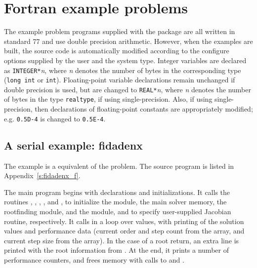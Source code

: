 \section{Fortran example problems}\label{s:ex_fortran}

The {\F} example problem programs supplied with the {\ida}
package are all written in standard {\F}77 and use double precision
arithmetic. However, when the {\F} examples are built, the source code is
automatically modified according to the configure options supplied by the
user and the system type. Integer variables are declared as {\tt INTEGER*}{\em n},
where {\em n} denotes the number of bytes in the corresponding {\C} type
({\tt long int} or {\tt int}). Floating-point variable declarations remain
unchanged if double precision is used, but are changed to {\tt REAL*}{\em n},
where {\em n} denotes the number of bytes in the {\sundials} type {\tt realtype},
if using single-precision. Also, if using single-precision, then declarations of
floating-point constants are appropriately modified; e.g. {\tt 0.5D-4} is
changed to {\tt 0.5E-4}.


\subsection{A serial example: fidadenx}\label{ss:fidadenx}

The  example is a {\F} equivalent of the  problem.
The source program  is listed in Appendix~\ref{s:fidadenx_f}.

The main program begins with declarations and initializations.  
It calls the routines , , , 
, and , to initialize the {\nvecs} module, 
the main solver memory, the rootfinding module, and the {\idadense} module, 
and to specify user-supplied Jacobian routine, respectively.
It calls  in a loop over  values, with printing of
the solution values and performance data (current order and step count
from the  array, and current step size from the  array).
In the case of a root return, an extra line is printed with the root
information from .  At the end, it prints a number of
performance counters, and frees memory with calls to 
and .


